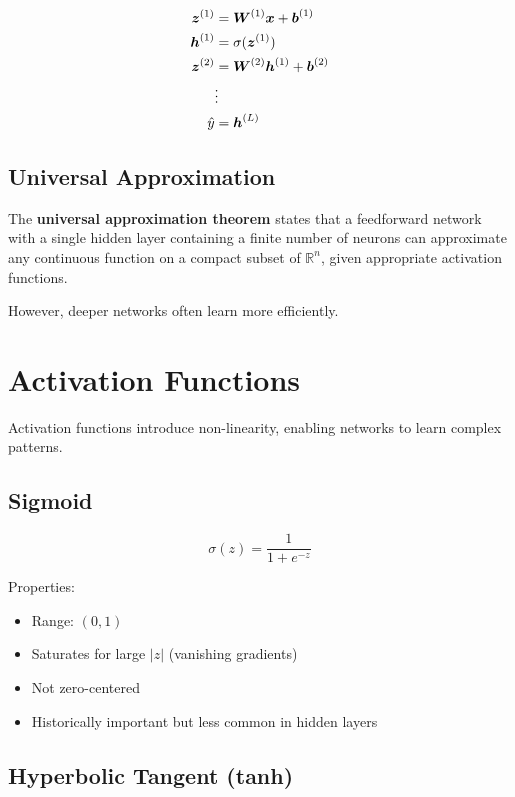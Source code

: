 \begin{align}
\boldsymbol{z}^{(1)} &= \boldsymbol{W}^{(1)} \boldsymbol{x} + \boldsymbol{b}^{(1)} \\
\boldsymbol{h}^{(1)} &= \sigma(\boldsymbol{z}^{(1)}) \\
\boldsymbol{z}^{(2)} &= \boldsymbol{W}^{(2)} \boldsymbol{h}^{(1)} + \boldsymbol{b}^{(2)} \\
&\vdots \\
\hat{y} &= \boldsymbol{h}^{(L)}
\end{align}

\subsection{Universal Approximation}

The \textbf{universal approximation theorem} states that a feedforward network with a single hidden layer containing a finite number of neurons can approximate any continuous function on a compact subset of $\mathbb{R}^n$, given appropriate activation functions.

However, deeper networks often learn more efficiently.

\section{Activation Functions}
\label{sec:activation-functions}

Activation functions introduce non-linearity, enabling networks to learn complex patterns.

\subsection{Sigmoid}

\begin{equation}
\sigma(z) = \frac{1}{1 + e^{-z}}
\end{equation}

Properties:
\begin{itemize}
    \item Range: $(0, 1)$
    \item Saturates for large $|z|$ (vanishing gradients)
    \item Not zero-centered
    \item Historically important but less common in hidden layers
\end{itemize}

\subsection{Hyperbolic Tangent (tanh)}

